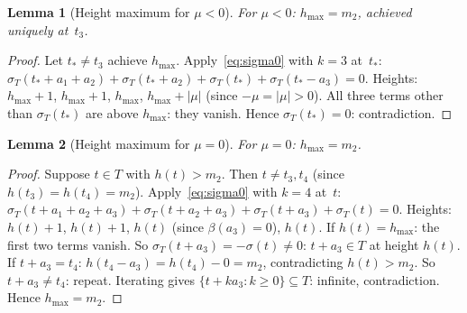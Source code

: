 \documentclass{article}
\newtheorem{lemma}{Lemma}
\begin{document}
\begin{lemma}[Height maximum for $\mu<0$]\label{lem:betamax4neg}
For $\mu<0$: $h_{\max}=m_2$, achieved uniquely at~$t_3$.
\end{lemma}
\begin{proof}
Let $t_*\ne t_3$ achieve $h_{\max}$.
Apply~\eqref{eq:sigma0} with $k=3$ at~$t_*$:
$\sigma_T(t_*+a_1+a_2)+\sigma_T(t_*+a_2)+\sigma_T(t_*)+\sigma_T(t_*-a_3)=0$.
Heights: $h_{\max}+1$, $h_{\max}+1$, $h_{\max}$, $h_{\max}+|\mu|$ (since $-\mu=|\mu|>0$).
All three terms other than $\sigma_T(t_*)$ are above $h_{\max}$: they vanish.
Hence $\sigma_T(t_*)=0$: contradiction.
\end{proof}

\begin{lemma}[Height maximum for $\mu=0$]\label{lem:betamax4zero}
For $\mu=0$: $h_{\max}=m_2$.
\end{lemma}
\begin{proof}
Suppose $t\in T$ with $h(t)>m_2$.  Then $t\ne t_3,t_4$ (since $h(t_3)=h(t_4)=m_2$).
Apply~\eqref{eq:sigma0} with $k=4$ at~$t$:
$\sigma_T(t+a_1+a_2+a_3)+\sigma_T(t+a_2+a_3)+\sigma_T(t+a_3)+\sigma_T(t)=0$.
Heights: $h(t)+1$, $h(t)+1$, $h(t)$ (since $\beta(a_3)=0$), $h(t)$.
If $h(t)=h_{\max}$: the first two terms vanish.  So $\sigma_T(t+a_3)=-\sigma(t)\ne 0$:
$t+a_3\in T$ at height $h(t)$.  If $t+a_3=t_4$: $h(t_4-a_3)=h(t_4)-0=m_2$,
contradicting $h(t)>m_2$.
So $t+a_3\ne t_4$: repeat.  Iterating gives $\{t+ka_3:k\ge 0\}\subseteq T$: infinite, contradiction.
Hence $h_{\max}=m_2$.
\end{proof}
\end{document}
